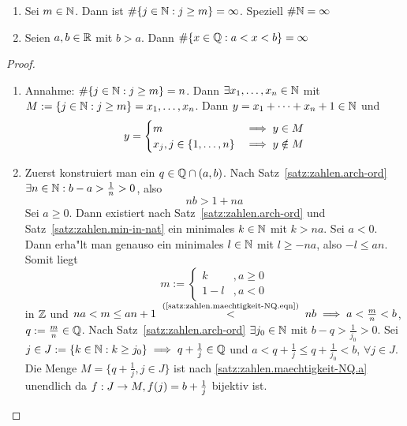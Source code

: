 \documentclass[12pt]{scrreprt}
\begin{document}
\begin{satz}\label{satz:zahlen.maechtigkeit-NQ}
\begin{enumerate}
\item \label{satz:zahlen.maechtigkeit-NQ.a}
Sei $m \in \mathbb{N}$. Dann ist $\#\{j\in\mathbb{N}:j\ge m\} = \infty$. Speziell $\#\mathbb{N} = \infty$
\item \label{satz:zahlen.maechtigkeit-NQ.b}
Seien $a, b \in \mathbb{R}$ mit $b > a$. Dann $\#\{x \in \mathbb{Q}:a < x<b\} = \infty$
\end{enumerate}
\end{satz}
\begin{proof}
\begin{enumerate}
\item Annahme: $\#\{j\in\mathbb{N}:j\ge m\} = n$. Dann $\exists x_1,\dotsc,x_n\in \mathbb{N}$
mit $M:=\{j\in\mathbb{N}:j\ge m\}={x_1, \dotsc, x_n}$. Dann
$y=x_1 + \dotsb  + x_n + 1 \in \mathbb{N}$ und 
\[ y =\begin{cases} m &\implies y \in M \\ x_j, j \in \{1, \dotsc, n\} & \implies y \notin M \end{cases}\]
\item Zuerst konstruiert man ein $q \in \mathbb{Q} \cap (a,b)$. Nach Satz~\ref{satz:zahlen.arch-ord} 
$\exists n \in \mathbb{N} : b-a > \frac{1}{n} > 0$, also 
\begin{equation}
nb > 1+na \label{satz:zahlen.maechtigkeit-NQ.eqn}\tag{$*$}
\end{equation}
Sei $a \ge 0$. Dann existiert nach Satz~\ref{satz:zahlen.arch-ord} und Satz~\ref{satz:zahlen.min-in-nat} ein minimales
$k\in\mathbb{N}$ mit $k>na$. Sei $a<0$. Dann erha"lt man genauso ein minimales $l \in \mathbb{N}$ mit $l \ge -na$,
also $-l\le an$. Somit liegt 
\[m:= 
\begin{cases}
	k &,a \ge0 \\
	1-l &, a<0
\end{cases}\]
in $\mathbb{Z}$ und $na < m \le an+1 \nach{<}{(\ref{satz:zahlen.maechtigkeit-NQ.eqn})} nb \folgt
a< \frac{m}{n} < b$, $q:= \frac{m}{n} \in \mathbb{Q}$.
Nach Satz~\ref{satz:zahlen.arch-ord} $\exists j_0 \in \mathbb{N}$ mit $b-q > \frac{1}{j_0} > 0$.
Sei $j \in J := \{k\in\mathbb{N}:k\ge j_0\} \implies q + \frac{1}{j} \in \mathbb{Q}$ und $a < q + \frac{1}{j}\le q + \frac{1}{j_0} < b$, 
$\forall j \in J$. Die Menge $M = \{q + \frac{1}{j}, j\in J\}$ ist nach \ref{satz:zahlen.maechtigkeit-NQ.a} unendlich da 
$f: J\rightarrow M, f(j) = b + \frac{1}{j}$ bijektiv ist.
\end{enumerate}
\end{proof}
\end{document}
